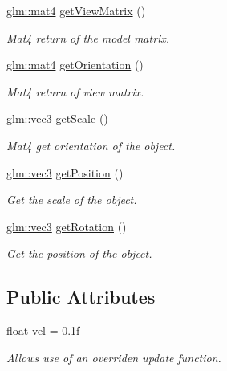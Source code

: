 \begin{DoxyCompactItemize}
\mbox{\hyperlink{group__core__types_ga7dcd2365c2e368e6af5b7adeb6a9c8df}{glm\+::mat4}} \mbox{\hyperlink{class_aspect_1_1_engine_1_1_transform_abda17c27d2ebf07d0e2acd66f953f93f}{get\+View\+Matrix}} ()
\begin{DoxyCompactList}\small\item\em Mat4 return of the model matrix. \end{DoxyCompactList}\item 
\mbox{\hyperlink{group__core__types_ga7dcd2365c2e368e6af5b7adeb6a9c8df}{glm\+::mat4}} \mbox{\hyperlink{class_aspect_1_1_engine_1_1_transform_a19574dc0c02837b729f58fbf8b5ad608}{get\+Orientation}} ()
\begin{DoxyCompactList}\small\item\em Mat4 return of view matrix. \end{DoxyCompactList}\item 
\mbox{\hyperlink{group__core__types_ga1c47e8b3386109bc992b6c48e91b0be7}{glm\+::vec3}} \mbox{\hyperlink{class_aspect_1_1_engine_1_1_transform_af606b12afa98e381b03af23063ce3762}{get\+Scale}} ()
\begin{DoxyCompactList}\small\item\em Mat4 get orientation of the object. \end{DoxyCompactList}\item 
\mbox{\hyperlink{group__core__types_ga1c47e8b3386109bc992b6c48e91b0be7}{glm\+::vec3}} \mbox{\hyperlink{class_aspect_1_1_engine_1_1_transform_a22d598d49c4a1605119ecdb51ec69b3b}{get\+Position}} ()
\begin{DoxyCompactList}\small\item\em Get the scale of the object. \end{DoxyCompactList}\item 
\mbox{\hyperlink{group__core__types_ga1c47e8b3386109bc992b6c48e91b0be7}{glm\+::vec3}} \mbox{\hyperlink{class_aspect_1_1_engine_1_1_transform_ab28c4e6547fca905528a650edd0bf8b3}{get\+Rotation}} ()
\begin{DoxyCompactList}\small\item\em Get the position of the object. \end{DoxyCompactList}\end{DoxyCompactItemize}
\subsection*{Public Attributes}
\begin{DoxyCompactItemize}
\item 
float \mbox{\hyperlink{class_aspect_1_1_engine_1_1_transform_a03724de24cdee495ce9518639f530497}{vel}} = 0.\+1f
\begin{DoxyCompactList}\small\item\em Allows use of an overriden update function. \end{DoxyCompactList}\end{DoxyCompactItemize}
